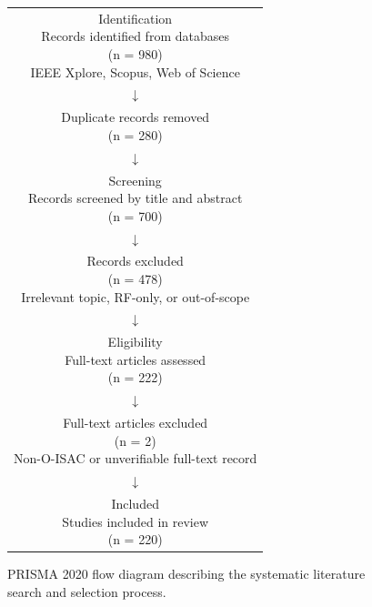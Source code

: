 \documentclass[letterpaper,journal]{IEEEtran}
\begin{document}
\begin{figure}[!t]
    \centering
    \setlength{\tabcolsep}{4pt}
    \renewcommand{\arraystretch}{1.15}
    \begin{tabular}{c}
        \fbox{\parbox{0.92\linewidth}{\centering Identification              \\Records identified from databases\\(n = 980)\\IEEE Xplore, Scopus, Web of Science}} \\
        $\downarrow$                                                         \\
        \fbox{\parbox{0.92\linewidth}{\centering Duplicate records removed   \\(n = 280)}} \\
        $\downarrow$                                                         \\
        \fbox{\parbox{0.92\linewidth}{\centering Screening                   \\Records screened by title and abstract\\(n = 700)}} \\
        $\downarrow$                                                         \\
        \fbox{\parbox{0.92\linewidth}{\centering Records excluded            \\(n = 478)\\Irrelevant topic, RF-only, or out-of-scope}} \\
        $\downarrow$                                                         \\
        \fbox{\parbox{0.92\linewidth}{\centering Eligibility                 \\Full-text articles assessed\\(n = 222)}} \\
        $\downarrow$                                                         \\
        \fbox{\parbox{0.92\linewidth}{\centering Full-text articles excluded \\(n = 2)\\Non-O-ISAC or unverifiable full-text record}} \\
        $\downarrow$                                                         \\
        \fbox{\parbox{0.92\linewidth}{\centering Included                    \\Studies included in review\\(n = 220)}}
    \end{tabular}
    \caption{PRISMA 2020 flow diagram describing the systematic literature search and selection process.}
    \label{fig:fig_iii_1}
\end{figure}
\end{document}
